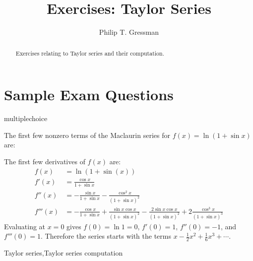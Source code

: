 \documentclass{ximera}
\title{Exercises: Taylor Series}
\author{Philip T. Gressman}
\begin{document}
\begin{abstract}
Exercises relating to Taylor series and their computation.
\end{abstract}
\maketitle

\section*{Sample Exam Questions}

\begin{question}[2015C.01]
\begin{type}
multiplechoice
\end{type}
The first few nonzero terms of the Maclaurin series for \(f(x) = \ln ( 1 + \sin x)\) are:
\begin{multiplechoice}
 \choicebreak
{}
 \choicebreak
{}
\end{multiplechoice}
\begin{feedback}
The first few derivatives of \(f(x)\) are:
\[\begin{aligned}
f(x) & = \ln (1 + \sin(x)) \\
f'(x) & = \frac{ \cos x}{1 + \sin x} \\
f''(x) & = - \frac{\sin x}{1 + \sin x} - \frac{\cos^2 x}{(1 + \sin x)^2} \\
f'''(x) & = - \frac{\cos x}{1 + \sin x} + \frac{\sin x \cos x}{(1 + \sin x)^2} - \frac{2 \sin x \cos x}{(1 + \sin x)^2} + 2 \frac{\cos^3 x}{(1 + \sin x)^3}
\end{aligned}\]
Evaluating at \(x = 0\) gives \(f(0) = \ln 1 = 0\), \(f'(0) = 1\), \(f''(0) = -1\), and \(f'''(0) = 1\). Therefore the series starts with the terms \(x - \frac{1}{2} x^2 + \frac{1}{6} x^3 + \cdots\).
\end{feedback}
\begin{keywords}
Taylor series,Taylor series computation
\end{keywords}
\end{question}
\end{document}
